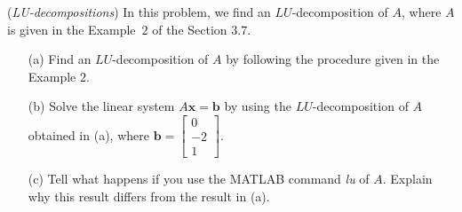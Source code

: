 \begin{exer}(\textit{LU-decompositions})
In this problem, we find an $LU$-decomposition of $A$, where $A$ is given in the \mbox{Example $2$} of the Section $3.7$.

\vspace{2mm}
\begin{enumerate}
\item[(a)] Find an $LU$-decomposition of $A$ by following the procedure given in the Example $2$.
\vspace{1mm}
\item[(b)] Solve the linear system $A \mathbf{x} = \mathbf{b}$ by using the $LU$-decomposition of $A$ obtained in (a), where $\textbf{b} = \left[\begin{array}{r} 0 \\ -2 \\ 1 \end{array} \right].$
\vspace{1mm}
\item[(c)] Tell what happens if you use the MATLAB command \textit{lu} of $A$. Explain why this result differs from the result in (a).

\end{enumerate}

\end{exer}


